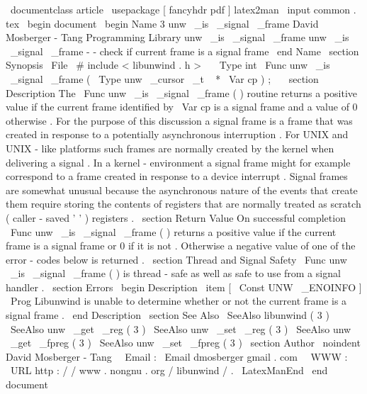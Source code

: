 \
documentclass
{
article
}
\
usepackage
[
fancyhdr
pdf
]
{
latex2man
}
\
input
{
common
.
tex
}
\
begin
{
document
}
\
begin
{
Name
}
{
3
}
{
unw
\
_is
\
_signal
\
_frame
}
{
David
Mosberger
-
Tang
}
{
Programming
Library
}
{
unw
\
_is
\
_signal
\
_frame
}
unw
\
_is
\
_signal
\
_frame
-
-
check
if
current
frame
is
a
signal
frame
\
end
{
Name
}
\
section
{
Synopsis
}
\
File
{
\
#
include
<
libunwind
.
h
>
}
\
\
\
Type
{
int
}
\
Func
{
unw
\
_is
\
_signal
\
_frame
}
(
\
Type
{
unw
\
_cursor
\
_t
~
*
}
\
Var
{
cp
}
)
;
\
\
\
section
{
Description
}
The
\
Func
{
unw
\
_is
\
_signal
\
_frame
}
(
)
routine
returns
a
positive
value
if
the
current
frame
identified
by
\
Var
{
cp
}
is
a
signal
frame
and
a
value
of
0
otherwise
.
For
the
purpose
of
this
discussion
a
signal
frame
is
a
frame
that
was
created
in
response
to
a
potentially
asynchronous
interruption
.
For
UNIX
and
UNIX
-
like
platforms
such
frames
are
normally
created
by
the
kernel
when
delivering
a
signal
.
In
a
kernel
-
environment
a
signal
frame
might
for
example
correspond
to
a
frame
created
in
response
to
a
device
interrupt
.
Signal
frames
are
somewhat
unusual
because
the
asynchronous
nature
of
the
events
that
create
them
require
storing
the
contents
of
registers
that
are
normally
treated
as
scratch
(
caller
-
saved
'
'
)
registers
.
\
section
{
Return
Value
}
On
successful
completion
\
Func
{
unw
\
_is
\
_signal
\
_frame
}
(
)
returns
a
positive
value
if
the
current
frame
is
a
signal
frame
or
0
if
it
is
not
.
Otherwise
a
negative
value
of
one
of
the
error
-
codes
below
is
returned
.
\
section
{
Thread
and
Signal
Safety
}
\
Func
{
unw
\
_is
\
_signal
\
_frame
}
(
)
is
thread
-
safe
as
well
as
safe
to
use
from
a
signal
handler
.
\
section
{
Errors
}
\
begin
{
Description
}
\
item
[
\
Const
{
UNW
\
_ENOINFO
}
]
\
Prog
{
Libunwind
}
is
unable
to
determine
whether
or
not
the
current
frame
is
a
signal
frame
.
\
end
{
Description
}
\
section
{
See
Also
}
\
SeeAlso
{
libunwind
(
3
)
}
\
SeeAlso
{
unw
\
_get
\
_reg
(
3
)
}
\
SeeAlso
{
unw
\
_set
\
_reg
(
3
)
}
\
SeeAlso
{
unw
\
_get
\
_fpreg
(
3
)
}
\
SeeAlso
{
unw
\
_set
\
_fpreg
(
3
)
}
\
section
{
Author
}
\
noindent
David
Mosberger
-
Tang
\
\
Email
:
\
Email
{
dmosberger
gmail
.
com
}
\
\
WWW
:
\
URL
{
http
:
/
/
www
.
nongnu
.
org
/
libunwind
/
}
.
\
LatexManEnd
\
end
{
document
}
